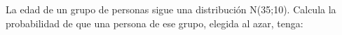 \documentclass[addpoints,spanish, 12pt,a4paper]{exam}
\begin{document}
\begin{questions}
    

\question La edad de un grupo de personas sigue una distribución N(35;10). Calcula la probabilidad de que una persona de ese grupo, elegida al azar, tenga:



\end{questions}
\end{document}
